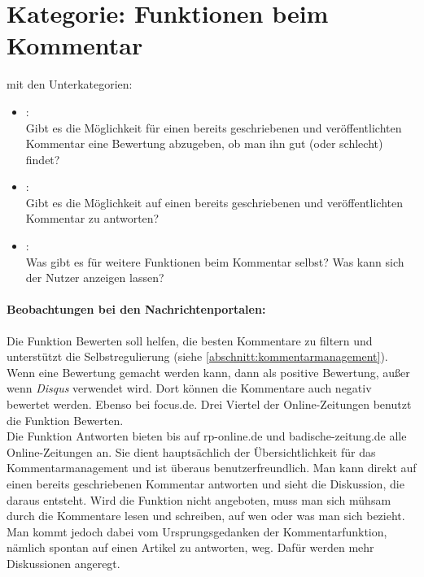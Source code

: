 \section{Kategorie: \glqq Funktionen beim Kommentar\grqq}

mit den Unterkategorien:
\begin{itemize}
\item{}\grqq:\\
Gibt es die Möglichkeit für einen bereits geschriebenen und veröffentlichten Kommentar eine Bewertung abzugeben, ob man ihn gut (oder schlecht) findet?

\item{}\grqq: \\
Gibt es die Möglichkeit auf einen bereits geschriebenen und veröffentlichten Kommentar zu antworten?


\item{}\grqq:\\
Was gibt es für weitere Funktionen beim Kommentar selbst? Was kann sich der Nutzer anzeigen lassen? 


\end{itemize}

\paragraph{Beobachtungen bei den Nachrichtenportalen:}

Die Funktion \glqq Bewerten\grqq \- soll helfen, die besten Kommentare zu
filtern und unterstützt die Selbstregulierung (siehe
\ref{abschnitt:kommentarmanagement}).  Wenn eine Bewertung gemacht werden kann,
dann als positive Bewertung, außer wenn  {\slshape Disqus} verwendet wird. Dort
können die Kommentare auch negativ bewertet werden. Ebenso bei focus.de.  Drei
Viertel der Online-Zeitungen benutzt die Funktion \glqq Bewerten\grqq. \\ Die
Funktion \glqq Antworten\grqq{} bieten bis auf rp-online.de und
badische-zeitung.de alle Online-Zeitungen an.  Sie dient hauptsächlich der
Übersichtlichkeit für das Kommentarmanagement und ist überaus
benutzerfreundlich. Man kann direkt auf einen bereits geschriebenen Kommentar
antworten und sieht die Diskussion, die daraus entsteht.  Wird die Funktion
nicht angeboten, muss man sich mühsam durch die Kommentare lesen und schreiben,
auf wen oder was man sich bezieht.  Man kommt jedoch dabei vom Ursprungsgedanken
der Kommentarfunktion, nämlich spontan auf einen Artikel zu antworten, weg.
Dafür werden mehr Diskussionen angeregt.

